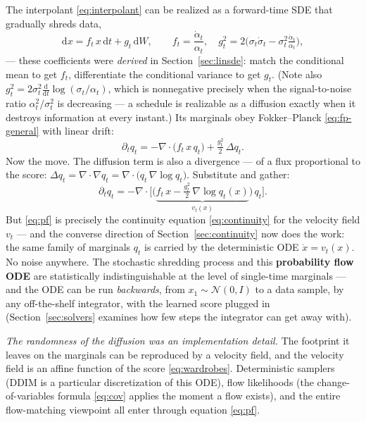 \documentclass[10pt,a4paper]{article}
\newcommand{\dd}{\mathrm{d}}
\begin{document}
The interpolant \eqref{eq:interpolant} can be realized as a forward-time
SDE that gradually shreds data,
\begin{equation}
\dd x = f_t\, x\, \dd t + g_t\, \dd W, \qquad
f_t = \frac{\dot\alpha_t}{\alpha_t}, \quad
g_t^2 = 2\big(\sigma_t\dot\sigma_t - \sigma_t^2 \tfrac{\dot\alpha_t}{\alpha_t}\big),
\label{eq:forward-sde}
\end{equation}
--- these coefficients were \emph{derived} in Section~\ref{sec:linsde}:
match the conditional mean to get $f_t$, differentiate the conditional
variance to get $g_t$. (Note also
$g_t^2 = 2\sigma_t^2 \tfrac{\dd}{\dd t}\log(\sigma_t/\alpha_t)$, which is
nonnegative precisely when the signal-to-noise ratio
$\alpha_t^2/\sigma_t^2$ is decreasing --- a schedule is realizable as a
diffusion exactly when it destroys information at every instant.) Its
marginals obey Fokker--Planck \eqref{eq:fp-general} with linear drift:
\begin{equation}
\partial_t q_t = -\nabla\!\cdot\!\big( f_t\, x\, q_t \big)
+ \tfrac{g_t^2}{2}\, \Delta q_t .
\end{equation}
Now the move. The diffusion term is also a divergence --- of a flux
proportional to the score:
$\Delta q_t = \nabla\!\cdot\!\nabla q_t
= \nabla\!\cdot\!\big( q_t\, \nabla\log q_t \big)$. Substitute and gather:
\begin{equation}
\partial_t q_t
= -\nabla\!\cdot\!\Big[ \Big( \underbrace{f_t\, x
- \tfrac{g_t^2}{2}\, \nabla\log q_t(x)}_{\textstyle v_t(x)} \Big)\, q_t \Big].
\label{eq:pf}
\end{equation}
But \eqref{eq:pf} is precisely the continuity equation
\eqref{eq:continuity} for the velocity field $v_t$ --- and the converse
direction of Section~\ref{sec:continuity} now does the work: the same
family of marginals $q_t$ is carried by the deterministic ODE
$\dot x = v_t(x)$. No noise anywhere. The stochastic shredding process and
this \textbf{probability flow ODE} are statistically indistinguishable at
the level of single-time marginals --- and the ODE can be run
\emph{backwards}, from $x_1 \sim \mathcal{N}(0, I)$ to a data sample, by
any off-the-shelf integrator, with the learned score plugged in
(Section~\ref{sec:solvers} examines how few steps the integrator can get
away with).

\emph{The randomness of the diffusion was an
implementation detail.} The footprint it leaves on the marginals can be
reproduced by a velocity field, and the velocity field is an affine
function of the score \eqref{eq:wardrobes}. Deterministic samplers (DDIM
is a particular discretization of this ODE), flow likelihoods (the
change-of-variables formula \eqref{eq:cov} applies the moment a flow
exists), and the entire flow-matching
viewpoint all enter through equation \eqref{eq:pf}.
\end{document}
